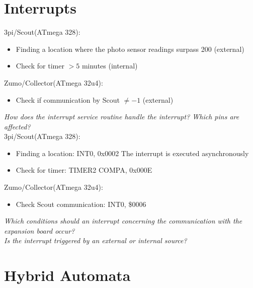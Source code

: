 \documentclass[12pt]{article}
\begin{document}
\newpage
\section*{Interrupts}
3pi/Scout(ATmega 328): \\
\begin{itemize}
\item Finding a location where the photo sensor readings surpass 200 (external)
\item Check for timer $> 5$ minutes (internal)
\end{itemize}
Zumo/Collector(ATmega 32u4): \\
\begin{itemize}
\item Check if communication by Scout $\neq -1$ (external)
\end{itemize} 

\flushleft
\textit{How does the interrupt service routine handle the interrupt? Which pins are affected?} \\

3pi/Scout(ATmega 328): \\
\begin{itemize}
\item Finding a location: INT0, 0x0002
The interrupt is executed asynchronously 
\item Check for timer: TIMER2 COMPA, 0x000E 
\end{itemize}
Zumo/Collector(ATmega 32u4): \\
\begin{itemize}
\item Check Scout communication: INT0, \$0006
\end{itemize}

\textit{Which conditions should an interrupt concerning the communication with the expansion board occur?} \\
\textit{Is the interrupt triggered by an external or internal source?} \\


\newpage
\section*{Hybrid Automata}
\end{document}

